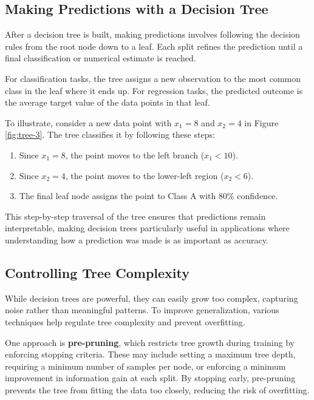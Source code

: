 \documentclass[
  11pt,
]{book}
\providecommand{\tightlist}{%
  \setlength{\itemsep}{0pt}\setlength{\parskip}{0pt}}
\theoremstyle{definition}
\theoremstyle{definition}
\theoremstyle{definition}
\theoremstyle{definition}
\theoremstyle{remark}
\begin{document}
\subsection*{Making Predictions with a Decision Tree}\label{making-predictions-with-a-decision-tree}


After a decision tree is built, making predictions involves following the decision rules from the root node down to a leaf. Each split refines the prediction until a final classification or numerical estimate is reached.

For classification tasks, the tree assigns a new observation to the most common class in the leaf where it ends up. For regression tasks, the predicted outcome is the average target value of the data points in that leaf.

To illustrate, consider a new data point with \(x_1 = 8\) and \(x_2 = 4\) in Figure \ref{fig:tree-3}. The tree classifies it by following these steps:

\begin{enumerate}
\def\labelenumi{\arabic{enumi}.}
\tightlist
\item
  Since \(x_1 = 8\), the point moves to the left branch (\(x_1 < 10\)).\\
\item
  Since \(x_2 = 4\), the point moves to the lower-left region (\(x_2 < 6\)).\\
\item
  The final leaf node assigns the point to Class A with 80\% confidence.
\end{enumerate}

This step-by-step traversal of the tree ensures that predictions remain interpretable, making decision trees particularly useful in applications where understanding how a prediction was made is as important as accuracy.

\subsection*{Controlling Tree Complexity}\label{controlling-tree-complexity}


While decision trees are powerful, they can easily grow too complex, capturing noise rather than meaningful patterns. To improve generalization, various techniques help regulate tree complexity and prevent overfitting.

One approach is \textbf{pre-pruning}, which restricts tree growth during training by enforcing stopping criteria. These may include setting a maximum tree depth, requiring a minimum number of samples per node, or enforcing a minimum improvement in information gain at each split. By stopping early, pre-pruning prevents the tree from fitting the data too closely, reducing the risk of overfitting.
\end{document}
